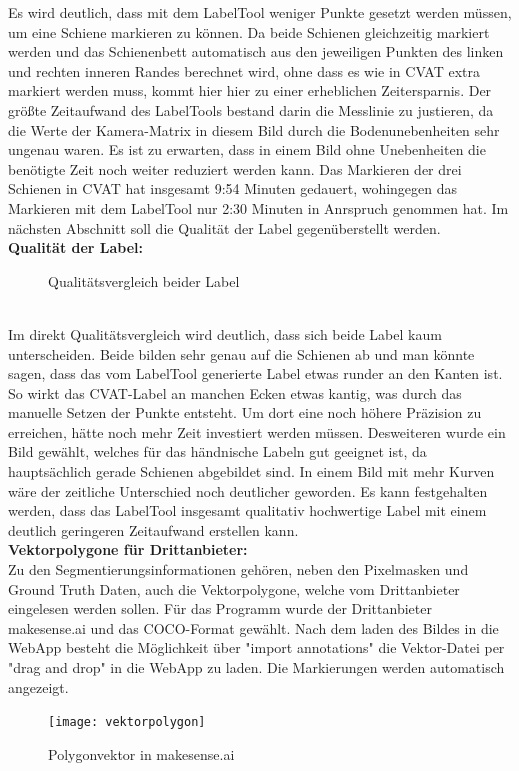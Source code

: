 \documentclass[11pt]{scrartcl}
\begin{document}
\noindent
Es wird deutlich, dass mit dem LabelTool weniger Punkte gesetzt werden müssen, um eine Schiene markieren zu können. Da beide Schienen gleichzeitig markiert werden und das Schienenbett automatisch aus den jeweiligen Punkten des linken und rechten inneren Randes berechnet wird, ohne dass es wie in CVAT extra markiert werden muss, kommt hier hier zu einer erheblichen Zeitersparnis. Der größte Zeitaufwand des LabelTools bestand darin die Messlinie zu justieren, da die Werte der Kamera-Matrix in diesem Bild durch die Bodenunebenheiten sehr ungenau waren. Es ist zu erwarten, dass in einem Bild ohne Unebenheiten die benötigte Zeit noch weiter reduziert werden kann. Das Markieren der drei Schienen in CVAT hat insgesamt 9:54 Minuten gedauert, wohingegen das Markieren mit dem LabelTool nur 2:30 Minuten in Anrspruch genommen hat. Im nächsten Abschnitt soll die Qualität der Label gegenüberstellt werden.
\\

\noindent
\textbf{Qualität der Label:}
\\

\noindent
\begin{figure}
\caption{Qualitätsvergleich beider Label}
\end{figure}
\\

\noindent
Im direkt Qualitätsvergleich wird deutlich, dass sich beide Label kaum unterscheiden. Beide bilden sehr genau auf die Schienen ab und man könnte sagen, dass das vom LabelTool generierte Label etwas runder an den Kanten ist. So wirkt das CVAT-Label an manchen Ecken etwas kantig, was durch das manuelle Setzen der Punkte entsteht. Um dort eine noch höhere Präzision zu erreichen, hätte noch mehr Zeit investiert werden müssen. Desweiteren wurde ein Bild gewählt, welches für das händnische Labeln gut geeignet ist, da hauptsächlich gerade Schienen abgebildet sind. In einem Bild mit mehr Kurven wäre der zeitliche Unterschied noch deutlicher geworden. Es kann festgehalten werden, dass das LabelTool insgesamt qualitativ hochwertige Label mit einem deutlich geringeren Zeitaufwand erstellen kann.
\\

\noindent
\textbf{Vektorpolygone für Drittanbieter:}
\\

\noindent
Zu den Segmentierungsinformationen gehören, neben den Pixelmasken und Ground Truth Daten, auch die Vektorpolygone, welche vom Drittanbieter eingelesen werden sollen. Für das Programm wurde der Drittanbieter makesense.ai und das COCO-Format gewählt. Nach dem laden des Bildes in die WebApp besteht die Möglichkeit über "import annotations" die Vektor-Datei per "drag and drop" in die WebApp zu laden. Die Markierungen werden automatisch angezeigt.
\begin{figure}[H]
  \texttt{[image: vektorpolygon]}
  \caption{Polygonvektor in makesense.ai}
\end{figure}
\end{document}
